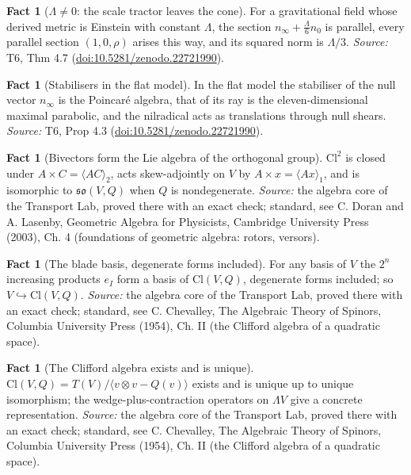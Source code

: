 \documentclass[11pt]{article}
\theoremstyle{definition}
\newtheorem{fact}[theorem]{Fact}
\theoremstyle{plain}
\providecommand{\Cl}{}\renewcommand{\Cl}{\mathrm{Cl}}
\providecommand{\nInf}{}\renewcommand{\nInf}{n_\infty}
\providecommand{\nO}{}\renewcommand{\nO}{n_0}
\providecommand{\so}{}\renewcommand{\so}{\mathfrak{so}}
\begin{document}
\begin{fact}[$\Lambda \neq 0$: the scale tractor leaves the cone]\label{c:interior.scale-tractor-leaves-cone}
For a gravitational field whose derived metric is Einstein with constant $\Lambda$, the section $\nInf + \tfrac{\Lambda}{6}\nO$ is parallel, every parallel section $(1, 0, \rho)$ arises this way, and its squared norm is $\Lambda/3$.
\emph{Source:} T6, Thm 4.7 (\href{https://doi.org/10.5281/zenodo.22721990}{doi:10.5281/zenodo.22721990}).
\end{fact}

\begin{fact}[Stabilisers in the flat model]\label{c:interior.stabilisers-flat-model}
In the flat model the stabiliser of the null vector $\nInf$ is the Poincar\'e algebra, that of its ray is the eleven-dimensional maximal parabolic, and the nilradical acts as translations through null shears.
\emph{Source:} T6, Prop 4.3 (\href{https://doi.org/10.5281/zenodo.22721990}{doi:10.5281/zenodo.22721990}).
\end{fact}

\begin{fact}[Bivectors form the Lie algebra of the orthogonal group]\label{c:std-algebra.bivector-lie-algebra}
$\Cl^{2}$ is closed under $A \times C = \langle AC \rangle_2$, acts skew-adjointly on $V$ by $A \times x = \langle Ax \rangle_1$, and is isomorphic to $\so(V,Q)$ when $Q$ is nondegenerate.
\emph{Source:} the algebra core of the Transport Lab, proved there with an exact check; standard, see C. Doran and A. Lasenby, Geometric Algebra for Physicists, Cambridge University Press (2003), Ch. 4 (foundations of geometric algebra: rotors, versors).
\end{fact}

\begin{fact}[The blade basis, degenerate forms included]\label{c:std-algebra.blade-basis}
For any basis of $V$ the $2^{n}$ increasing products $e_I$ form a basis of $\Cl(V, Q)$, degenerate forms included; so $V \hookrightarrow \Cl(V, Q)$.
\emph{Source:} the algebra core of the Transport Lab, proved there with an exact check; standard, see C. Chevalley, The Algebraic Theory of Spinors, Columbia University Press (1954), Ch. II (the Clifford algebra of a quadratic space).
\end{fact}

\begin{fact}[The Clifford algebra exists and is unique]\label{c:std-algebra.existence-uniqueness}
$\Cl(V, Q) = T(V)/\langle v \otimes v - Q(v) \rangle$ exists and is unique up to unique isomorphism; the wedge-plus-contraction operators on $\Lambda V$ give a concrete representation.
\emph{Source:} the algebra core of the Transport Lab, proved there with an exact check; standard, see C. Chevalley, The Algebraic Theory of Spinors, Columbia University Press (1954), Ch. II (the Clifford algebra of a quadratic space).
\end{fact}
\end{document}
